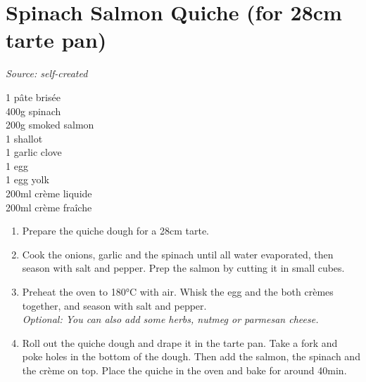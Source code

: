 \documentclass{report}
\begin{document}
\section[Spinach Salmon Quiche]{Spinach Salmon Quiche (for 28cm tarte pan)}
\textit{Source: self-created}\\
\begin{minipage}[t]{0.21\textwidth} \vspace{0pt} 
1 pâte brisée\\
400g spinach\\
200g smoked salmon\\
1 shallot\\
1 garlic clove\\
1 egg\\
1 egg yolk\\
200ml crème liquide\\
200ml crème fraîche 
\end{minipage}
\hfill
\begin{minipage}[t]{0.78\textwidth} \vspace{0pt}
	\begin{enumerate}
		\item Prepare the quiche dough for a 28cm tarte.
		\item Cook the onions, garlic and the spinach until all water evaporated, then season with salt and pepper. Prep the salmon by cutting it in small cubes.
		\item Preheat the oven to 180°C with air. Whisk the egg and the both crèmes together, and season with salt and pepper.\\
		\textit{Optional: You can also add some herbs, nutmeg or parmesan cheese.}
		\item Roll out the quiche dough and drape it in the tarte pan. Take a fork and poke holes in the bottom of the dough. Then add the salmon, the spinach and the crème on top. Place the quiche in the oven and bake for around 40min.
	\end{enumerate}	
\end{minipage}
\end{document}
